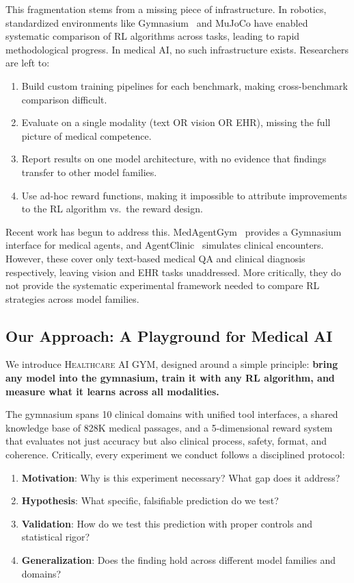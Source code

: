 \documentclass{article}
\newcommand{\gym}{\textsc{Healthcare AI GYM}}
\begin{document}
This fragmentation stems from a missing piece of infrastructure. In robotics, standardized environments like Gymnasium~\citep{towers2024gymnasium} and MuJoCo have enabled systematic comparison of RL algorithms across tasks, leading to rapid methodological progress. In medical AI, no such infrastructure exists. Researchers are left to:

\begin{enumerate}[nosep, leftmargin=*]
    \item Build custom training pipelines for each benchmark, making cross-benchmark comparison difficult.
    \item Evaluate on a single modality (text OR vision OR EHR), missing the full picture of medical competence.
    \item Report results on one model architecture, with no evidence that findings transfer to other model families.
    \item Use ad-hoc reward functions, making it impossible to attribute improvements to the RL algorithm vs.\ the reward design.
\end{enumerate}

Recent work has begun to address this. MedAgentGym~\citep{medagentgym2026} provides a Gymnasium interface for medical agents, and AgentClinic~\citep{schmidgall2025agentclinic} simulates clinical encounters. However, these cover only text-based medical QA and clinical diagnosis respectively, leaving vision and EHR tasks unaddressed. More critically, they do not provide the systematic experimental framework needed to compare RL strategies across model families.

\subsection{Our Approach: A Playground for Medical AI}

We introduce \gym{}, designed around a simple principle: \textbf{bring any model into the gymnasium, train it with any RL algorithm, and measure what it learns across all modalities.}

The gymnasium spans 10 clinical domains with unified tool interfaces, a shared knowledge base of 828K medical passages, and a 5-dimensional reward system that evaluates not just accuracy but also clinical process, safety, format, and coherence. Critically, every experiment we conduct follows a disciplined protocol:

\begin{enumerate}[nosep, leftmargin=*]
    \item \textbf{Motivation}: Why is this experiment necessary? What gap does it address?
    \item \textbf{Hypothesis}: What specific, falsifiable prediction do we test?
    \item \textbf{Validation}: How do we test this prediction with proper controls and statistical rigor?
    \item \textbf{Generalization}: Does the finding hold across different model families and domains?
\end{enumerate}
\end{document}
